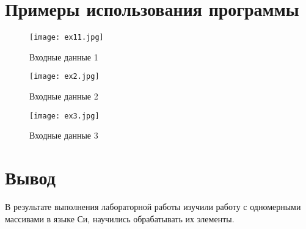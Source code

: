 \documentclass[a4paper,12pt]{report}
\begin{document}
\section*{Примеры использования программы}
    \begin{figure}[h]
        \texttt{[image: ex11.jpg]}
    \caption{Входные данные 1}
    \label{ris:image}
            
        \texttt{[image: ex2.jpg]}
    \caption{Входные данные 2}
    \label{ris:image}
    
        \texttt{[image: ex3.jpg]}
    \caption{Входные данные 3}
    \label{ris:image}
\end{figure}

\section*{Вывод}
В результате выполнения лабораторной работы изучили работу с одномерными массивами в языке Си, научились обрабатывать их элементы.
\end{document}
